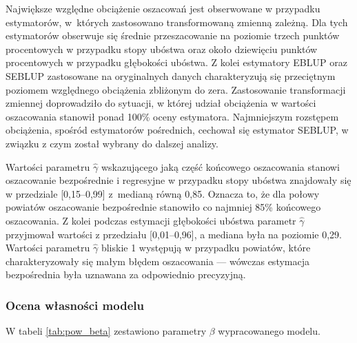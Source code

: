Największe względne obciążenie oszacowań jest obserwowane w przypadku estymatorów, w~których zastosowano transformowaną zmienną zależną. Dla tych estymatorów obserwuje się średnie przeszacowanie na poziomie trzech punktów procentowych w przypadku stopy ubóstwa oraz około dziewięciu punktów procentowych w przypadku głębokości ubóstwa. Z kolei estymatory EBLUP oraz SEBLUP zastosowane na oryginalnych danych charakteryzują się przeciętnym poziomem względnego obciążenia zbliżonym do zera. Zastosowanie transformacji zmiennej doprowadziło do sytuacji, w której udział obciążenia w wartości oszacowania stanowił ponad 100\% oceny estymatora. Najmniejszym rozstępem obciążenia, spośród estymatorów pośrednich, cechował się estymator SEBLUP, w związku z czym został wybrany do dalszej analizy.

Wartości parametru $\hat{\gamma}$ wskazującego jaką część końcowego oszacowania stanowi oszacowanie bezpośrednie i regresyjne w przypadku stopy ubóstwa znajdowały się w przedziale {[}0,15--0,99{]} z~medianą równą 0,85. Oznacza to, że dla połowy powiatów oszacowanie bezpośrednie stanowiło co najmniej 85\% końcowego oszacowania. Z kolei podczas estymacji głębokości ubóstwa parametr $\hat{\gamma}$ przyjmował wartości z przedziału {[}0,01--0,96{]}, a mediana była na poziomie 0,29. Wartości parametru $\hat{\gamma}$ bliskie 1 występują w przypadku powiatów, które charakteryzowały się małym błędem oszacowania --- wówczas estymacja bezpośrednia była uznawana za odpowiednio precyzyjną.

\subsubsection{Ocena własności modelu}

W tabeli \ref{tab:pow_beta} zestawiono parametry $\beta$ wypracowanego modelu.

